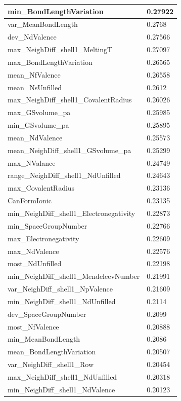\begin{longtable}{|l|l|}
min\_BondLengthVariation & 0.27922 \\ \hline
var\_MeanBondLength & 0.2768 \\ \hline
dev\_NdValence & 0.27566 \\ \hline
max\_NeighDiff\_shell1\_MeltingT & 0.27097 \\ \hline
max\_BondLengthVariation & 0.26565 \\ \hline
mean\_NfValence & 0.26558 \\ \hline
mean\_NsUnfilled & 0.2612 \\ \hline
max\_NeighDiff\_shell1\_CovalentRadius & 0.26026 \\ \hline
max\_GSvolume\_pa & 0.25985 \\ \hline
min\_GSvolume\_pa & 0.25895 \\ \hline
mean\_NdValence & 0.25573 \\ \hline
mean\_NeighDiff\_shell1\_GSvolume\_pa & 0.25299 \\ \hline
max\_NValance & 0.24749 \\ \hline
range\_NeighDiff\_shell1\_NdUnfilled & 0.24643 \\ \hline
max\_CovalentRadius & 0.23136 \\ \hline
CanFormIonic & 0.23135 \\ \hline
min\_NeighDiff\_shell1\_Electronegativity & 0.22873 \\ \hline
min\_SpaceGroupNumber & 0.22766 \\ \hline
max\_Electronegativity & 0.22609 \\ \hline
max\_NdValence & 0.22576 \\ \hline
most\_NdUnfilled & 0.22198 \\ \hline
min\_NeighDiff\_shell1\_MendeleevNumber & 0.21991 \\ \hline
var\_NeighDiff\_shell1\_NpValence & 0.21609 \\ \hline
min\_NeighDiff\_shell1\_NdUnfilled & 0.2114 \\ \hline
dev\_SpaceGroupNumber & 0.2099 \\ \hline
most\_NfValence & 0.20888 \\ \hline
min\_MeanBondLength & 0.2086 \\ \hline
mean\_BondLengthVariation & 0.20507 \\ \hline
var\_NeighDiff\_shell1\_Row & 0.20454 \\ \hline
max\_NeighDiff\_shell1\_NdUnfilled & 0.20318 \\ \hline
min\_NeighDiff\_shell1\_NdValence & 0.20123 \\ \hline

\end{longtable}
